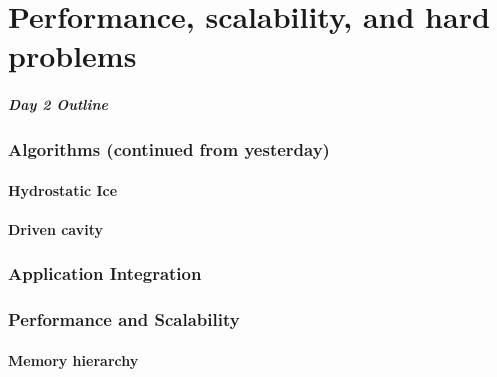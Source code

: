 \documentclass{beamer}
\begin{document}
% 
% 
% 

\part{Performance, scalability, and hard problems}
\begin{frame}
\frametitle{Day 2 Outline}
\tableofcontents
\end{frame}

\section{Algorithms (continued from yesterday)}
\subsection{Hydrostatic Ice}

\subsection{Driven cavity}



\section{Application Integration}








\section{Performance and Scalability}
%

\subsection{Memory hierarchy}







%
\end{document}
